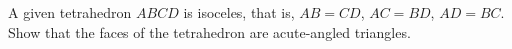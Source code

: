 A given tetrahedron $ ABCD$ is isoceles, that is, $ AB=CD$,  $ AC=BD$,  $ AD=BC$. Show that the faces of the tetrahedron are acute-angled triangles.